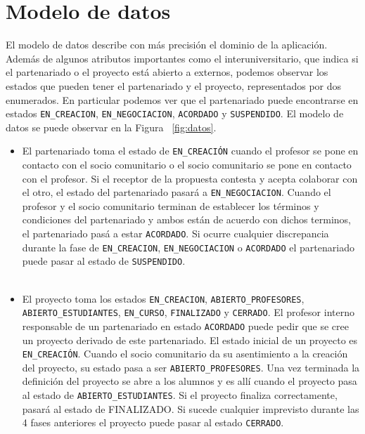\documentclass[11pt]{book}
\begin{document}
\section{Modelo de datos}
El modelo de datos describe con más precisión el dominio de la aplicación.
Además de algunos atributos importantes como el interuniversitario, que indica si el partenariado o el proyecto está abierto a externos, podemos observar los estados que pueden tener el partenariado y el proyecto, representados por dos enumerados. En particular podemos ver que el partenariado puede encontrarse en estados \texttt{EN\_CREACION}, \texttt{EN\_NEGOCIACION}, \texttt{ACORDADO} y \texttt{SUSPENDIDO}. El modelo de datos se puede observar en la Figura ~\ref{fig:datos}.\\
\begin{itemize} 
	\item El partenariado toma el estado de \texttt{EN\_CREACIÓN} cuando el profesor se pone en contacto con el socio comunitario o el socio comunitario se pone en contacto con el profesor. Si el receptor de la propuesta contesta y acepta colaborar con el otro, el estado del partenariado pasará a \texttt{EN\_NEGOCIACION}. Cuando el profesor y el socio comunitario terminan de establecer los términos y condiciones del partenariado y ambos están de acuerdo con dichos terminos, el partenariado pasá a estar \texttt{ACORDADO}. Si ocurre cualquier discrepancia durante la fase de \texttt{EN\_CREACION}, \texttt{EN\_NEGOCIACION} o \texttt{ACORDADO} el partenariado puede pasar al estado de \texttt{SUSPENDIDO}.\\\\
	\item El proyecto toma los estados \texttt{EN\_CREACION}, \texttt{ABIERTO\_PROFESORES}, \texttt{ABIERTO\_ESTUDIANTES}, \texttt{EN\_CURSO}, \texttt{FINALIZADO} y \texttt{CERRADO}.
	El profesor interno responsable de un partenariado en estado \texttt{ACORDADO}  puede pedir que se cree un proyecto derivado de este partenariado. El
	estado inicial de un proyecto es \texttt{EN\_CREACIÓN}. Cuando el socio
	comunitario da su asentimiento a la creación del proyecto, su estado
	pasa a ser \texttt{ABIERTO\_PROFESORES}. Una vez terminada la definición del proyecto se abre a los alumnos y es allí cuando el proyecto pasa al estado de \texttt{ABIERTO\_ESTUDIANTES}. Si el proyecto finaliza correctamente, pasará al estado de FINALIZADO. Si sucede cualquier imprevisto durante las 4 fases anteriores el proyecto puede pasar al estado \texttt{CERRADO}.
\end{itemize} 
\end{document}

